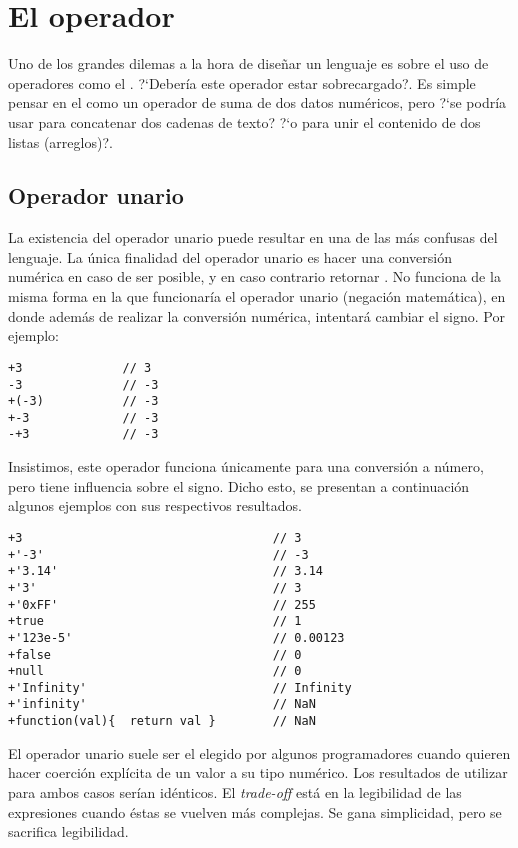 \section{El operador \code{+}}
\label{sec:operadormas}

Uno de los grandes dilemas a la hora de diseñar un lenguaje es sobre el uso de operadores como el \code{+}. ?`Debería este operador estar sobrecargado?. Es simple pensar en el \code{+} como un operador de suma de dos datos numéricos, pero ?`se podría usar para concatenar dos cadenas de texto? ?`o para unir el contenido de dos listas (arreglos)?.

\subsection{Operador unario}

La existencia del operador unario \code{+} puede resultar en una de las más confusas del lenguaje. La única finalidad del operador unario \code{+} es hacer una conversión numérica en caso de ser posible, y en caso contrario retornar . No funciona de la misma forma en la que funcionaría el operador unario \code{-} (negación matemática), en donde además de realizar la conversión numérica, intentará cambiar el signo. Por ejemplo:

\begin{lstlisting}[title={Operador unario \code{+}}]
+3				// 3
-3				// -3
+(-3)			// -3
+-3				// -3
-+3				// -3
\end{lstlisting}

Insistimos, este operador funciona únicamente para una conversión a número, pero tiene influencia sobre el signo. Dicho esto, se presentan a continuación algunos ejemplos con sus respectivos resultados.

\begin{lstlisting}[title={Operador unario \code{+} (más casos)}]
+3                                   // 3
+'-3'                                // -3
+'3.14'                              // 3.14
+'3'                                 // 3
+'0xFF'                              // 255
+true                                // 1
+'123e-5'                            // 0.00123
+false                               // 0
+null                                // 0
+'Infinity'                          // Infinity
+'infinity'                          // NaN
+function(val){  return val }        // NaN
\end{lstlisting}

El operador unario \code{+} suele ser el elegido por algunos programadores cuando quieren hacer coerción explícita de un valor a su tipo numérico. Los resultados de utilizar  para ambos casos serían idénticos. El \textit{trade-off} está en la legibilidad de las expresiones cuando éstas se vuelven más complejas. Se gana simplicidad, pero se sacrifica legibilidad.

